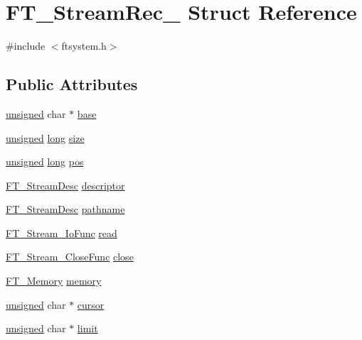 \hypertarget{struct_f_t___stream_rec__}{\section{F\-T\-\_\-\-Stream\-Rec\-\_\- Struct Reference}
\label{struct_f_t___stream_rec__}
}


{\ttfamily \#include $<$ftsystem.\-h$>$}

\subsection*{Public Attributes}
\begin{DoxyCompactItemize}
\item 
\hyperlink{_free_image_8h_a425076c7067a1b5166e2cc530e914814}{unsigned} char $\ast$ \hyperlink{struct_f_t___stream_rec___a7b406cb9a60c5a8b4bd8d04b7a23cfee}{base}
\item 
\hyperlink{_free_image_8h_a425076c7067a1b5166e2cc530e914814}{unsigned} \hyperlink{_free_image_8h_a7701bb16365a51acda9234120673781d}{long} \hyperlink{struct_f_t___stream_rec___ab00e3cf802c950d0ca5a022a06953123}{size}
\item 
\hyperlink{_free_image_8h_a425076c7067a1b5166e2cc530e914814}{unsigned} \hyperlink{_free_image_8h_a7701bb16365a51acda9234120673781d}{long} \hyperlink{struct_f_t___stream_rec___a5bf82c2ff4554752edfeec442fba2f33}{pos}
\item 
\hyperlink{ftsystem_8h_ad7ddff377e42bfb38bec17f11fa75911}{F\-T\-\_\-\-Stream\-Desc} \hyperlink{struct_f_t___stream_rec___a361c44020eace21cc453b51852d8cc4f}{descriptor}
\item 
\hyperlink{ftsystem_8h_ad7ddff377e42bfb38bec17f11fa75911}{F\-T\-\_\-\-Stream\-Desc} \hyperlink{struct_f_t___stream_rec___afd75c5de5ed78c484a200a7e97ef5a41}{pathname}
\item 
\hyperlink{ftsystem_8h_ac519e286320678727c62e40e09474bca}{F\-T\-\_\-\-Stream\-\_\-\-Io\-Func} \hyperlink{struct_f_t___stream_rec___af724049d0258d4988c2b11c3a08b1b05}{read}
\item 
\hyperlink{ftsystem_8h_a24013c9d02cdde7d9de6b80c958d8795}{F\-T\-\_\-\-Stream\-\_\-\-Close\-Func} \hyperlink{struct_f_t___stream_rec___a7d7c7a1d7de8f580d7ad66efe89defa9}{close}
\item 
\hyperlink{ftsystem_8h_a67ec7ea35cde99a89a65e9f827a9ad3a}{F\-T\-\_\-\-Memory} \hyperlink{struct_f_t___stream_rec___a51e2be0d80d70b532aae3face5461e7e}{memory}
\item 
\hyperlink{_free_image_8h_a425076c7067a1b5166e2cc530e914814}{unsigned} char $\ast$ \hyperlink{struct_f_t___stream_rec___ab7dbbad87d8b6d0178771a06e1ce8b4d}{cursor}
\item 
\hyperlink{_free_image_8h_a425076c7067a1b5166e2cc530e914814}{unsigned} char $\ast$ \hyperlink{struct_f_t___stream_rec___aff006e6ee3bbc2741a2c4ae79b1bad3a}{limit}
\end{DoxyCompactItemize}


